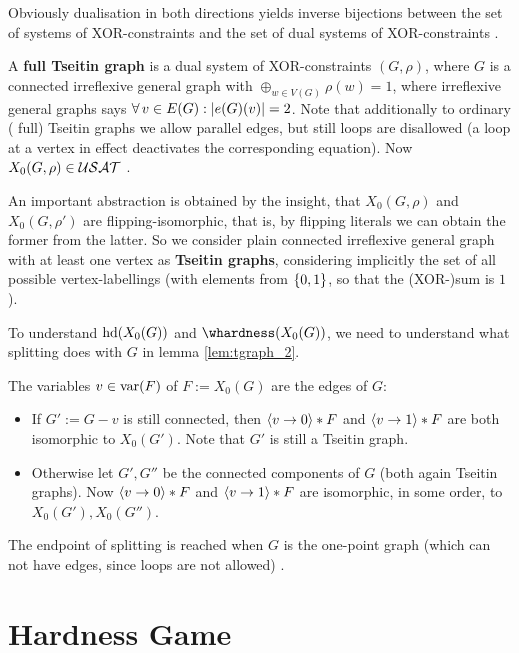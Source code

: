 \documentclass[12pt]{book}
\begin{document}
Obviously dualisation in both directions yields inverse bijections between the set of systems of XOR-constraints and the set of dual systems of XOR-constraints \cite{h5}.

\begin{defi}\label{def:tgraph}
A \textbf{full Tseitin graph} is a dual system of XOR-constraints $(G,\rho)$, where $G$ is a connected irreflexive general graph with 
$\oplus_{w \in V(G)} \rho(w) = 1$, where irreflexive general graphs says $\forall\, v \in E(G) : \lvert e(G)(v) \rvert = 2$. Note that additionally to ordinary (
full) Tseitin graphs we allow parallel edges, but still loops are disallowed (a loop at a vertex in effect deactivates the corresponding equation). 
Now $X_0(G,\rho) \in \mathcal{USAT}$ \cite{h5}.
\end{defi}

An important abstraction is obtained by the insight, that $X_0(G,\rho)$ and $X_0(G,\rho')$ are flipping-isomorphic, that is, by flipping literals we 
can obtain the former from the latter. So we consider plain connected irreflexive general graph with at least one vertex as \textbf{Tseitin graphs}, 
considering implicitly the set of all possible vertex-labellings (with elements from $\{ 0,1 \}$, so that the (XOR-)sum is $1$).

To understand $\operatorname{hd}(X_0(G))$ and $\whardness(X_0(G))$, we need to understand what splitting does with $G$ in lemma \ref{lem:tgraph_2}. 
\begin{lem}\label{lem:tgraph_2}
The variables $v \in \operatorname{var}(F)$ of $F := X_0(G)$ are the edges of $G$:
\begin{itemize}
\item If $G' := G - v$ is still connected, then $\langle v \rightarrow 0 \rangle * F$ and $\langle v \rightarrow 1 \rangle * F$ are both isomorphic to $X_0(G')$. Note that $G'$ is still a Tseitin graph.
\item Otherwise let $G', G''$ be the connected components of $G$ (both again Tseitin graphs). Now $\langle v \rightarrow 0 \rangle * F$ and $\langle v \rightarrow 1 \rangle * F$ are isomorphic, in some 
order, to $X_0(G'), X_0(G'')$.
\end{itemize}
The endpoint of splitting is reached when $G$ is the one-point graph (which can not have edges, since loops are not allowed) \cite{h5}. 
\end{lem}

\section{Hardness Game}
\label{sec:Hardness Game}	  
\end{document}
